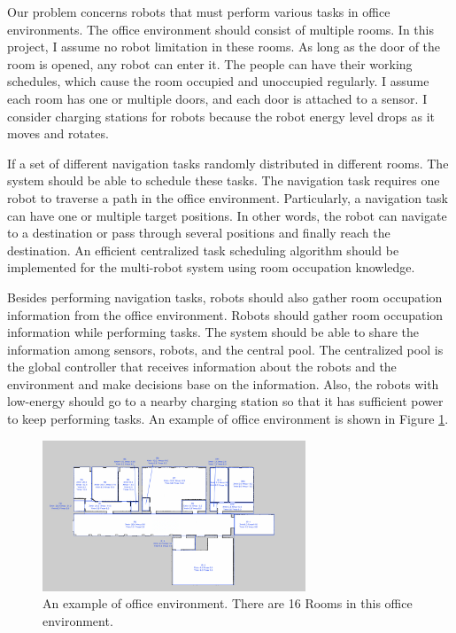 Our problem concerns robots that must perform various tasks in office environments. The office environment should consist of multiple rooms. In this project, I assume no robot limitation in these rooms. As long as the door of the room is opened, any robot can enter it. The people can have their working schedules, which cause the room occupied and unoccupied regularly. I assume each room has one or multiple doors, and each door is attached to a sensor. I consider charging stations for robots because the robot energy level drops as it moves and rotates. 

If a set of different navigation tasks randomly distributed in different rooms. The system should be able to schedule these tasks. The navigation task requires one robot to traverse a path in the office environment. Particularly, a navigation task can have one or multiple target positions. In other words, the robot can navigate to a destination or pass through several positions and finally reach the destination. An efficient centralized task scheduling algorithm should be implemented for the multi-robot system using room occupation knowledge.

Besides performing navigation tasks, robots should also gather room occupation information from the office environment. Robots should gather room occupation information while performing tasks. The system should be able to share the information among sensors, robots, and the central pool. The centralized pool is the global controller that receives information about the robots and the environment and make decisions base on the information. Also, the robots with low-energy should go to a nearby charging station so that it has sufficient power to keep performing tasks.
An example of office environment is shown in Figure \ref{fig:example_environment}.

\begin{figure}[htbp]
    \centering
    \includegraphics[width = 0.7\textwidth]{content/images/ch1/room_division.png}
    \caption{An example of office environment. There are 16 Rooms in this office environment.}
    \label{fig:example_environment}
\end{figure}

